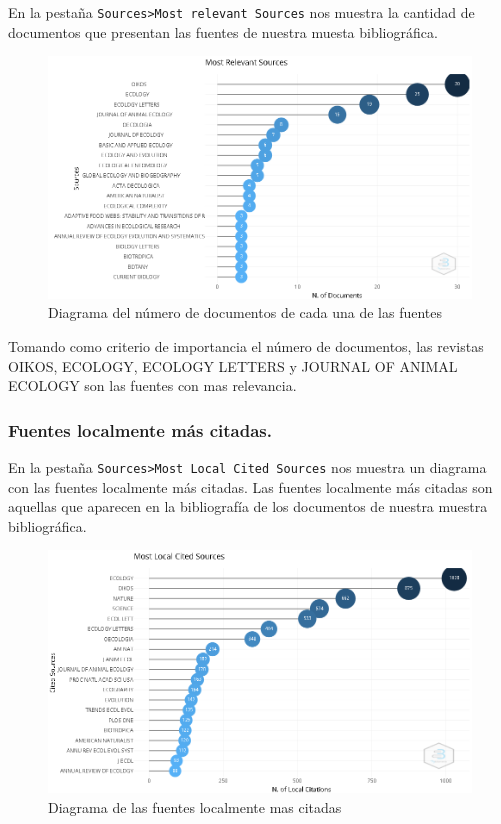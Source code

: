 \documentclass[
]{article}
\begin{document}
En la pestaña \texttt{Sources\textgreater{}Most\ relevant\ Sources} nos
muestra la cantidad de documentos que presentan las fuentes de nuestra
muesta bibliográfica.

\begin{figure}
\centering
\includegraphics{MostRelevantSources.png}
\caption{Diagrama del número de documentos de cada una de las fuentes}
\end{figure}

Tomando como criterio de importancia el número de documentos, las
revistas OIKOS, ECOLOGY, ECOLOGY LETTERS y JOURNAL OF ANIMAL ECOLOGY son
las fuentes con mas relevancia.

\hypertarget{fuentes-localmente-muxe1s-citadas.}{%
\subsubsection{Fuentes localmente más
citadas.}\label{fuentes-localmente-muxe1s-citadas.}}

En la pestaña \texttt{Sources\textgreater{}Most\ Local\ Cited\ Sources}
nos muestra un diagrama con las fuentes localmente más citadas. Las
fuentes localmente más citadas son aquellas que aparecen en la
bibliografía de los documentos de nuestra muestra bibliográfica.

\begin{figure}
\centering
\includegraphics{MostLocalCitedSources.png}
\caption{Diagrama de las fuentes localmente mas citadas}
\end{figure}
\end{document}

